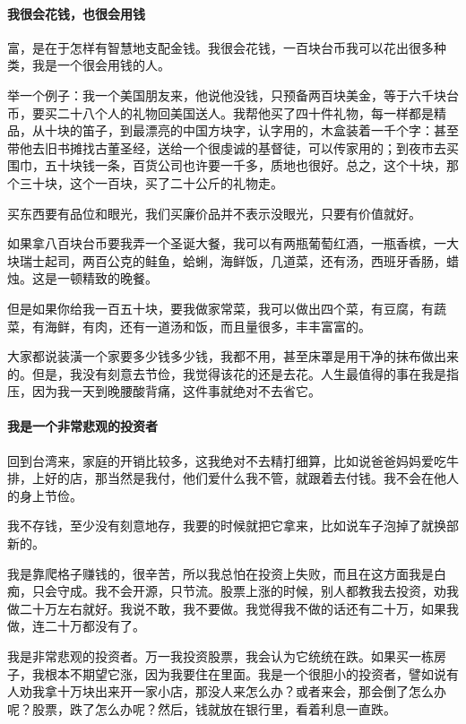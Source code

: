 \paragraph*{我很会花钱，也很会用钱}
\par 富，是在于怎样有智慧地支配金钱。我很会花钱，一百块台币我可以花出很多种类，我是一个很会用钱的人。
\par 举一个例子：我一个美国朋友来，他说他没钱，只预备两百块美金，等于六千块台币，要买二十八个人的礼物回美国送人。我帮他买了四十件礼物，每一样都是精品，从十块的笛子，到最漂亮的中国方块字，认字用的，木盒装着一千个字：甚至带他去旧书摊找古董圣经，送给一个很虔诚的基督徒，可以传家用的；到夜市去买围巾，五十块钱一条，百货公司也许要一千多，质地也很好。总之，这个十块，那个三十块，这个一百块，买了二十公斤的礼物走。
\par 买东西要有品位和眼光，我们买廉价品并不表示没眼光，只要有价值就好。
\par 如果拿八百块台币要我弄一个圣诞大餐，我可以有两瓶葡萄红酒，一瓶香槟，一大块瑞士起司，两百公克的鲑鱼，蛤蜊，海鲜饭，几道菜，还有汤，西班牙香肠，蜡烛。这是一顿精致的晚餐。
\par 但是如果你给我一百五十块，要我做家常菜，我可以做出四个菜，有豆腐，有蔬菜，有海鲜，有肉，还有一道汤和饭，而且量很多，丰丰富富的。
\par 大家都说装潢一个家要多少钱多少钱，我都不用，甚至床罩是用干净的抹布做出来的。但是，我没有刻意去节俭，我觉得该花的还是去花。人生最值得的事在我是指压，因为我一天到晚腰酸背痛，这件事就绝对不去省它。
\paragraph*{我是一个非常悲观的投资者}
\par 回到台湾来，家庭的开销比较多，这我绝对不去精打细算，比如说爸爸妈妈爱吃牛排，上好的店，那当然是我付，他们爱什么我不管，就跟着去付钱。我不会在他人的身上节俭。
\par 我不存钱，至少没有刻意地存，我要的时候就把它拿来，比如说车子泡掉了就换部新的。
\par 我是靠爬格子赚钱的，很辛苦，所以我总怕在投资上失败，而且在这方面我是白痴，只会守成。我不会开源，只节流。股票上涨的时候，别人都教我去投资，劝我做二十万左右就好。我说不敢，我不要做。我觉得我不做的话还有二十万，如果我做，连二十万都没有了。
\par 我是非常悲观的投资者。万一我投资股票，我会认为它统统在跌。如果买一栋房子，我根本不期望它涨，因为我要住在里面。我是一个很胆小的投资者，譬如说有人劝我拿十万块出来开一家小店，那没人来怎么办？或者来会，那会倒了怎么办呢？股票，跌了怎么办呢？然后，钱就放在银行里，看着利息一直跌。

